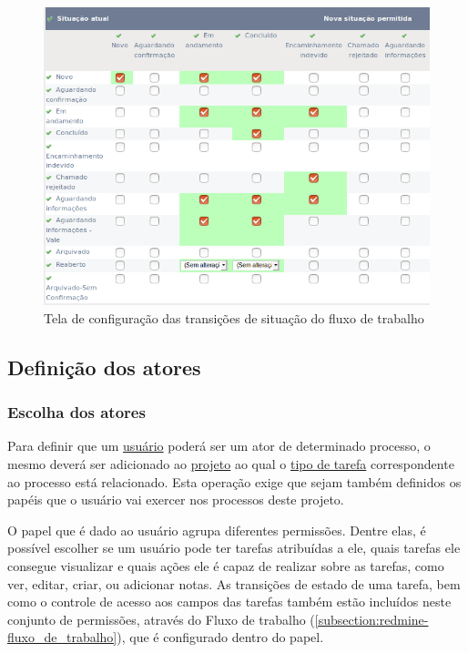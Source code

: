 \begin{figure}[H]
  \centering
  \includegraphics[width=1.0\textwidth]{imagens/workflow_status.png}
  \caption{Tela de configuração das transições de situação do fluxo de trabalho}
  \label{fig:redmine_transicoes}
\end{figure}

\subsection{Definição dos atores}\label{subsection:redmine-automatizar_processo-atores}

\subsubsection{Escolha dos atores}

Para definir que um \underline{usuário} poderá ser um ator de determinado processo, o mesmo deverá ser adicionado ao \underline{projeto} ao qual o \underline{tipo de tarefa} correspondente ao processo está relacionado. Esta operação exige que sejam também definidos os papéis que o usuário vai exercer nos processos deste projeto.

O papel que é dado ao usuário agrupa diferentes permissões. Dentre elas, é possível escolher se um usuário pode ter tarefas atribuídas a ele, quais tarefas ele consegue visualizar e quais ações ele é capaz de realizar sobre as tarefas, como ver, editar, criar, ou adicionar notas. As transições de estado de uma tarefa, bem como o controle de acesso aos campos das tarefas também estão incluídos neste conjunto de permissões, através do Fluxo de trabalho (\ref{subsection:redmine-fluxo_de_trabalho}), que é configurado dentro do papel.


